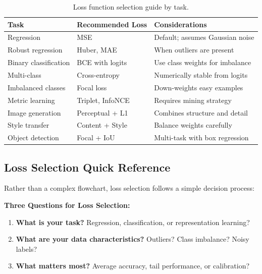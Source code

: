 \documentclass[../../main.tex]{subfiles}
\begin{document}
\begin{table}[htbp]
\centering
\caption{Loss function selection guide by task.}
\label{tab:loss-selection}
\begin{tabular}{@{}p{3.5cm}p{3.5cm}p{5cm}@{}}
\toprule
\textbf{Task} & \textbf{Recommended Loss} & \textbf{Considerations} \\
\midrule
Regression & MSE & Default; assumes Gaussian noise \\
Robust regression & Huber, MAE & When outliers are present \\
Binary classification & BCE with logits & Use class weights for imbalance \\
Multi-class & Cross-entropy & Numerically stable from logits \\
Imbalanced classes & Focal loss & Down-weights easy examples \\
Metric learning & Triplet, InfoNCE & Requires mining strategy \\
Image generation & Perceptual + L1 & Combines structure and detail \\
Style transfer & Content + Style & Balance weights carefully \\
Object detection & Focal + IoU & Multi-task with box regression \\
\bottomrule
\end{tabular}
\end{table}


\subsection{Loss Selection Quick Reference}

Rather than a complex flowchart, loss selection follows a simple decision process:

\begin{keyconcept}
\textbf{Three Questions for Loss Selection:}
\begin{enumerate}
    \item \textbf{What is your task?} Regression, classification, or representation learning?
    \item \textbf{What are your data characteristics?} Outliers? Class imbalance? Noisy labels?
    \item \textbf{What matters most?} Average accuracy, tail performance, or calibration?
\end{enumerate}
\end{keyconcept}
\end{document}
